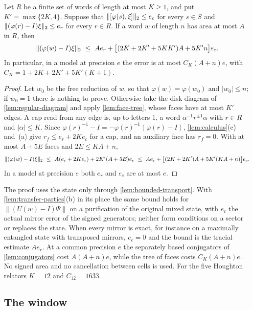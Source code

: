 \begin{theorem}\label{thm:linear-filling}
Let $R$ be a finite set of words of length at most $K\ge1$, and put $K'=\max\{2K,4\}$. Suppose that $\lVert [\varphi(s),\xi]\rVert_2\le e_c$
for every $s\in S$ and $\lVert (\varphi(r)-I)\xi\rVert_2\le e_r$ for every $r\in R$. If a word $w$ of length $n$ has area at most $A$ in $R$,
then
\[
\hs{(\varphi(w)-I)\xi}\ \le\ Ae_r+\bigl[(2K+2K'+5KK')A+5K'n\bigr]e_c .
\]
In particular, in a model at precision $e$ the error is at most $C_K(A+n)e$, with $C_K=1+2K+2K'+5K'(K+1)$.
\end{theorem}

\begin{proof}
Let $w_0$ be the free reduction of $w$, so that $\varphi(w)=\varphi(w_0)$ and $|w_0|\le n$; if $w_0=1$ there is nothing to prove.
Otherwise take the disk diagram of \cref{lem:regular-diagram} and apply \cref{lem:face-tree}, whose faces have at most $K'$
edges. A cap read from any edge is, up to letters $1$, a word $\alpha^{-1}r^{\pm1}\alpha$ with $r\in R$ and $|\alpha|\le K$. Since
$\varphi(r)^{-1}-I=-\varphi(r)^{-1}(\varphi(r)-I)$, \cref{lem:calculus}(c) and~(a) give $r_f\le e_r+2Ke_c$ for a cap, and an auxiliary
face has $r_f=0$. With at most $A+5E$ faces and $2E\le KA+n$,
\[
\hs{(\varphi(w)-I)\xi}\ \le\ A(e_r+2Ke_c)+2K'(A+5E)e_c\ \le\ Ae_r+\bigl[(2K+2K')A+5K'(KA+n)\bigr]e_c .
\]
In a model at precision $e$ both $e_r$ and $e_c$ are at most $e$.
\end{proof}

\begin{remark}\label{rem:linear-filling}
The proof uses the state only through \cref{lem:bounded-transport}. With \cref{lem:transfer-parties}(b) in its place the same
bound holds for $\|(U(w)-I)\Psi\|$ on a purification of the original mixed state, with $e_c$ the actual mirror error of the signed
generators; neither form conditions on a sector or replaces the state. When every mirror is exact, for instance on a maximally
entangled state with transposed mirrors, $e_c=0$ and the bound is the tracial estimate $Ae_r$. At a common precision $e$ the
separately based conjugators of \cref{lem:conjugators} cost $A(A+n)e$, while the tree of faces costs $C_K(A+n)e$. No signed area
and no cancellation between cells is used. For the five Houghton relators $K=12$ and $C_{12}=1633$.
\end{remark}

\subsection{The window}\label{sec:point-window}

